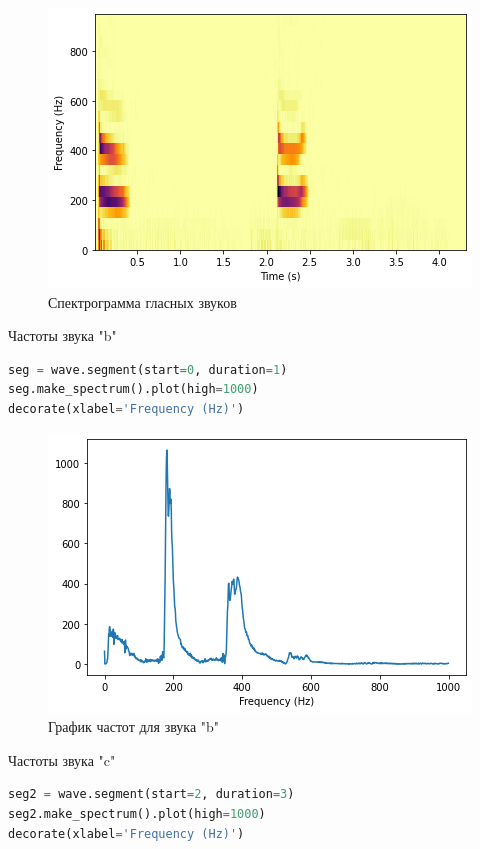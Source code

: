 \begin{figure}[H]
	\begin{center}
		\includegraphics[scale=1]{fig/lab03/lab03_14.png}
		\caption{Спектрограмма гласных звуков}
	\end{center}
\end{figure}

Частоты звука "b"

\begin{lstlisting}[language=Python]
seg = wave.segment(start=0, duration=1)
seg.make_spectrum().plot(high=1000)
decorate(xlabel='Frequency (Hz)')
\end{lstlisting}

\begin{figure}[H]
	\begin{center}
		\includegraphics[scale=1]{fig/lab03/lab03_15.png}
		\caption{График частот для звука "b"}
	\end{center}
\end{figure}

Частоты звука "c"

\begin{lstlisting}[language=Python]
seg2 = wave.segment(start=2, duration=3)
seg2.make_spectrum().plot(high=1000)
decorate(xlabel='Frequency (Hz)')
\end{lstlisting}

